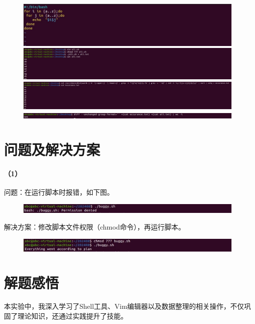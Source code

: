 \documentclass[a4paper, 12pt]{article}
\begin{document}
	\begin{figure}[H]
		\centering
		\includegraphics[width=1\textwidth]{045.jpg}
		\includegraphics[width=1\textwidth]{046.jpg}
		\includegraphics[width=1\textwidth]{047.jpg}
		\includegraphics[width=1\textwidth]{048.jpg}
	\end{figure}
	
	\section{问题及解决方案}
	
	\paragraph{（1）}
	问题：在运行脚本时报错，如下图。
	
	\begin{figure}[h]
		\centering
		\includegraphics[width=1\textwidth]{013.jpg}
	\end{figure}
	
	解决方案：修改脚本文件权限（chmod命令），再运行脚本。
	
	\begin{figure}[h]
		\centering
		\includegraphics[width=1\textwidth]{014.jpg}
	\end{figure}
	
	\section{解题感悟}
	本实验中，我深入学习了Shell工具、Vim编辑器以及数据整理的相关操作，不仅巩固了理论知识，还通过实践提升了技能。
		
\end{document}
